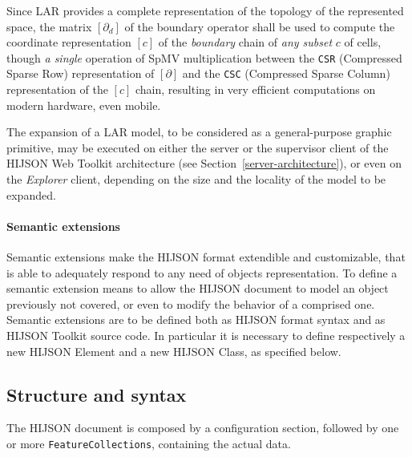 Since LAR provides a complete representation of the topology of the represented space,
the matrix $[\partial_d]$ of the boundary operator shall be used to compute the coordinate representation $[c]$ of the \emph{boundary} chain of \emph{any subset} $c$ of cells, though \emph{a single} operation of SpMV multiplication \cite{gemmexp} between the \texttt{CSR} (Compressed Sparse Row) representation of $[\partial]$ and the \texttt{CSC} (Compressed Sparse Column) representation of the $[c]$ chain, resulting in very efficient computations on modern hardware, even mobile.

The expansion of a LAR model, to be considered as a general-purpose graphic primitive, may be executed on either the server or the supervisor client of the HIJSON Web Toolkit architecture (see Section~\ref{server-architecture}), or even on the \emph{Explorer} client, depending on the size and the locality of the model to be expanded.



\paragraph*{Semantic extensions}\label{semantic-extensions}

Semantic extensions make the HIJSON format extendible and customizable, that
is able to adequately respond to any need of objects representation. To define a
semantic extension means to allow the HIJSON document to model an object
previously not covered, or even to modify the behavior of a comprised one.
Semantic extensions are to be defined both as HIJSON format syntax and as
HIJSON Toolkit source code. In particular it is necessary to define respectively
a new HIJSON Element and a new HIJSON Class, as specified below.


\subsection{Structure and syntax}\label{syntax-structure}

The HIJSON document is composed by a configuration section, followed by one or more {\tt FeatureCollections}, containing the actual data.

